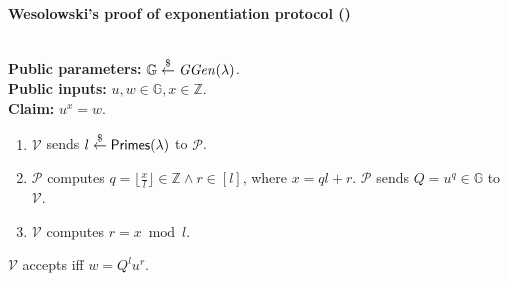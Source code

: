 \begin{mdframed}
\begin{center}
        \textbf{Wesolowski's proof of exponentiation  protocol (\poe)}
    \end{center}
\hfill\\    
\textbf{Public parameters:} $\mathbb{G}\stackrel{\$}{\gets}\mathit{GGen}(\lambda)$.\hfill\\
\textbf{Public inputs:} $u,w\in\mathbb{G},x\in\mathbb{Z}$.\hfill\\
\textbf{Claim:} $u^x=w$.
\begin{enumerate}
    \item $\mathcal{V}$ sends $l\stackrel{\$}{\gets}\mathsf{Primes}(\lambda)$ to $\mathcal{P}$.
    \item $\mathcal{P}$ computes $q=\lfloor\frac{x}{l}\rfloor\in\mathbb{Z}\land r\in[l]$, where $x=ql+r$. $\mathcal{P}$ sends $Q=u^q\in\mathbb{G}$ to $\mathcal{V}$.
    \item $\mathcal{V}$ computes $r=x\bmod{l}$.
\end{enumerate}
    $\mathcal{V}$ accepts iff $w=Q^{l}u^{r}$.
\end{mdframed}